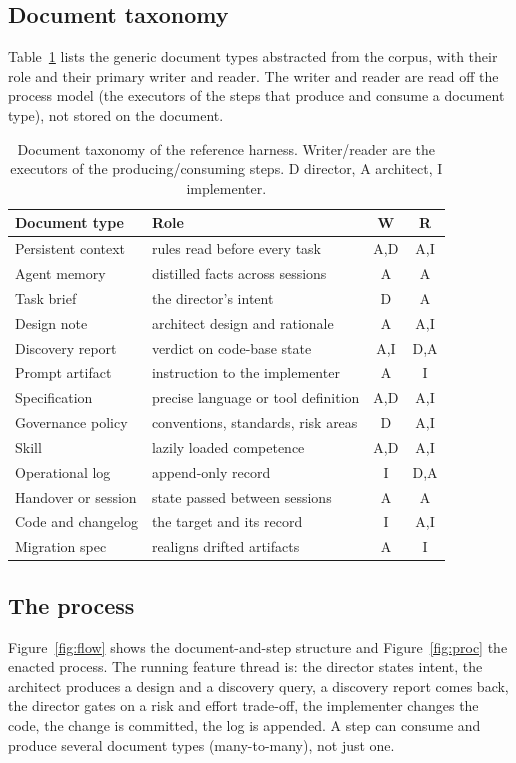 \documentclass[sigconf]{acmart}
\begin{document}
\subsection{Document taxonomy}
Table~\ref{tab:tax} lists the generic document types abstracted from the corpus, with their role and their primary writer and reader. The writer and reader are read off the process model (the executors of the steps that produce and consume a document type), not stored on the document.

\begin{table}[t]
\caption{Document taxonomy of the reference harness. Writer/reader are the executors of the producing/consuming steps. D director, A architect, I implementer.}
\label{tab:tax}
\scriptsize
\begin{tabularx}{\columnwidth}{@{}p{2.4cm}Xcc@{}}
\toprule
Document type & Role & W & R \\
\midrule
Persistent context & rules read before every task & A,D & A,I \\
Agent memory & distilled facts across sessions & A & A \\
Task brief & the director's intent & D & A \\
Design note & architect design and rationale & A & A,I \\
Discovery report & verdict on code-base state & A,I & D,A \\
Prompt artifact & instruction to the implementer & A & I \\
Specification & precise language or tool definition & A,D & A,I \\
Governance policy & conventions, standards, risk areas & D & A,I \\
Skill & lazily loaded competence & A,D & A,I \\
Operational log & append-only record & I & D,A \\
Handover or session & state passed between sessions & A & A \\
Code and changelog & the target and its record & I & A,I \\
Migration spec & realigns drifted artifacts & A & I \\
\bottomrule
\end{tabularx}
\end{table}

\subsection{The process}
Figure~\ref{fig:flow} shows the document-and-step structure and Figure~\ref{fig:proc} the enacted process. The running feature thread is: the director states intent, the architect produces a design and a discovery query, a discovery report comes back, the director gates on a risk and effort trade-off, the implementer changes the code, the change is committed, the log is appended. A step can consume and produce several document types (many-to-many), not just one.
\end{document}
